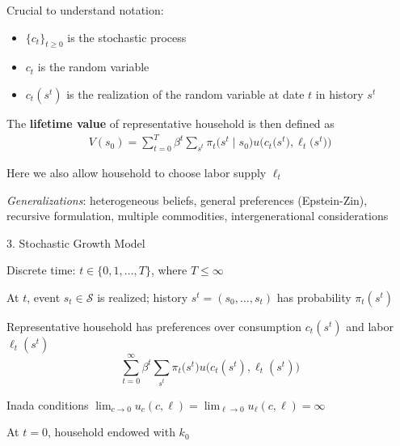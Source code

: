 \documentclass[11pt, aspectratio=169]{beamer}
\newenvironment{witemize}{\itemize\addtolength{\itemsep}{10pt}}{\enditemize}
\begin{document}
\begin{frame}{}
\begin{witemize}
\item Crucial to understand notation:
\begin{itemize}
\item $\{ c_t \}_{t \geq 0}$ is the stochastic process
\item $c_t$ is the random variable
\item $c_t(s^t)$ is the realization of the random variable at date $t$ in history $s^t$
\end{itemize}

\item The \textbf{lifetime value} of representative household is then defined as
\begin{align*}
	V(s_0) = \sum_{t=0}^T \beta^t \sum_{s^t} \pi_t \Big( s^t \mid s_0 \Big) u \Big( c_t \Big( s^t \Big), \ell_t \Big(s^t \Big) \Big)
\end{align*}

\item Here we also allow household to choose labor supply $\ell_t$

\item \textit{Generalizations}: heterogeneous beliefs, general preferences (Epstein-Zin), recursive formulation, multiple commodities, intergenerational considerations

\end{witemize}
\end{frame}



\begin{frame}{3. Stochastic Growth Model}
\begin{witemize}
\item Discrete time: $t \in \{0, 1, \ldots, T\}$, where $T \leq \infty$

\item At $t$, event $s_t \in \mathcal{S}$ is realized; history $s^t = (s_0, \ldots, s_t)$ has probability $\pi_t(s^t)$

\item Representative household has preferences over consumption $c_t(s^t)$ and labor $\ell_t(s^t)$ 
\begin{equation*}
	\sum_{t=0}^\infty \beta^t \sum_{s^t} \pi_t\Big(s^t \Big) u \Big( c_t(s^t), \ell_t(s^t) \Big)
\end{equation*}

\item Inada conditions $\lim_{c\to 0} u_c(c, \ell) = \lim_{\ell \to0} u_\ell (c, \ell) = \infty$

\item At $t=0$, household endowed with $k_0$
\end{witemize}
\end{frame}
\end{document}
